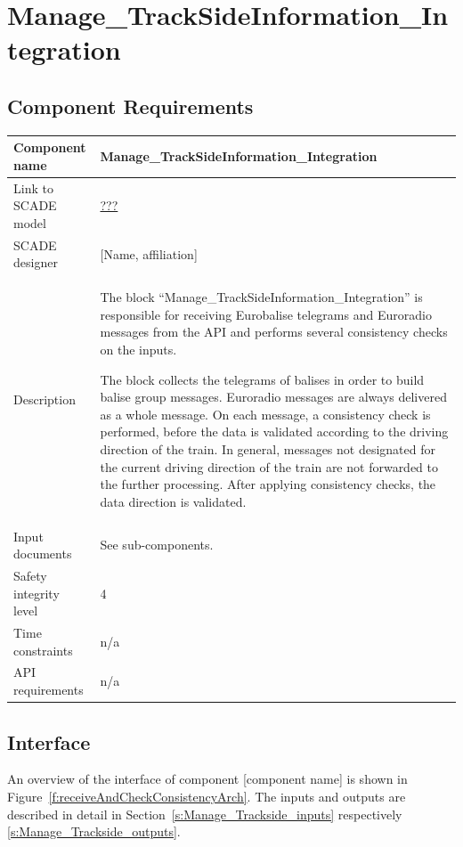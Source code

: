 
\section{Manage\_TrackSideInformation\_Integration}

\subsection{Component Requirements}

\begin{longtable}{p{}p{}}
\toprule
Component name			& Manage\_TrackSideInformation\_Integration \\
\midrule
Link to SCADE model		& {\footnotesize \url{???}} \\
\midrule
SCADE designer			& [Name, affiliation] \\
\midrule
Description				& The block ``Manage\_TrackSideInformation\_Integration'' is responsible for receiving Eurobalise telegrams and Euroradio messages from the API and performs several consistency checks on the inputs.\newline

The block collects the telegrams of balises in order to build balise group messages. Euroradio messages are always delivered as a whole message. On each message, a consistency check is performed, before the data is validated according to the driving direction of the train. In general, messages not designated for the current driving direction of the train are not forwarded to the further processing. After applying consistency checks, the data direction is validated. \\
\midrule
Input documents	& 
See sub-components.\\
\midrule
Safety integrity level		& 4 \\
\midrule
Time constraints		& n/a \\
\midrule
API requirements 		& n/a \\
\bottomrule
\end{longtable}


\subsection{Interface}

An overview of the interface of component [component name] is shown in Figure~\ref{f:receiveAndCheckConsistencyArch}. The inputs and outputs are described in detail in Section~\ref{s:Manage_Trackside_inputs} respectively \ref{s:Manage_Trackside_outputs}.

